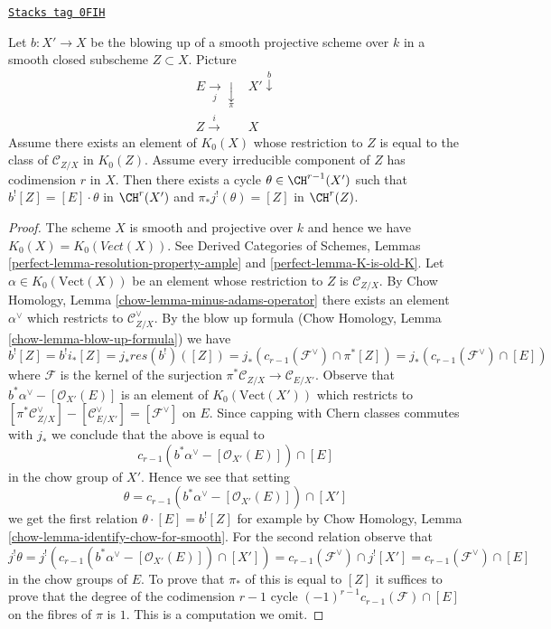 \begin{lemma}
\label{weil-lemma-divide-pullback-good-blowing-up}
\href{https://stacks.math.columbia.edu/tag/0FIH}{\texttt{Stacks tag 0FIH}}

Let $b : X' \to X$ be the blowing up of a smooth projective
scheme over $k$ in a smooth closed subscheme $Z \subset X$.
Picture
$$
\begin{array}{cc}E \underset{j}{\longrightarrow}\underset{\pi}{\downarrow} & X' \overset{b}{\downarrow} \\ Z \overset{i}{\longrightarrow} & X\end{array}
$$
Assume there exists an element of $K_0(X)$ whose restriction to
$Z$ is equal to the class of $\mathcal{C}_{Z/X}$ in $K_0(Z)$.
Assume every irreducible component of $Z$ has codimension $r$ in $X$.
Then there exists a cycle $\theta \in \CH^{r - 1}(X')$
such that $b^![Z] = [E] \cdot \theta$ in $\CH^r(X')$ and
$\pi_*j^!(\theta) = [Z]$ in $\CH^r(Z)$.
\end{lemma}

\begin{proof}
The scheme $X$ is smooth and projective over $k$ and hence we have
$K_0(X) = K_0(\textit{Vect}(X))$. See
Derived Categories of Schemes, Lemmas
\ref{perfect-lemma-resolution-property-ample} and
\ref{perfect-lemma-K-is-old-K}.
Let $\alpha \in K_0(\text{Vect}(X))$ be an element
whose restriction to $Z$ is $\mathcal{C}_{Z/X}$.
By Chow Homology, Lemma \ref{chow-lemma-minus-adams-operator}
there exists an element $\alpha^\vee$ which restricts to
$\mathcal{C}_{Z/X}^\vee$. By the blow up formula
(Chow Homology, Lemma \ref{chow-lemma-blow-up-formula})
we have
$$
b^![Z] = b^!i_*[Z] = j_* res(b^!)([Z]) =
j_*(c_{r - 1}(\mathcal{F}^\vee) \cap \pi^*[Z]) =
j_*(c_{r - 1}(\mathcal{F}^\vee) \cap [E])
$$
where $\mathcal{F}$ is the kernel of the surjection
$\pi^*\mathcal{C}_{Z/X} \to \mathcal{C}_{E/X'}$.
Observe that $b^*\alpha^\vee - [\mathcal{O}_{X'}(E)]$
is an element of $K_0(\text{Vect}(X'))$ which
restricts to $[\pi^*\mathcal{C}_{Z/X}^\vee] - [\mathcal{C}_{E/X'}^\vee] =
[\mathcal{F}^\vee]$ on $E$. Since capping with Chern classes
commutes with $j_*$ we conclude that the above is equal to
$$
c_{r - 1}(b^*\alpha^\vee - [\mathcal{O}_{X'}(E)]) \cap [E]
$$
in the chow group of $X'$. Hence we see that setting
$$
\theta = c_{r - 1}(b^*\alpha^\vee - [\mathcal{O}_{X'}(E)]) \cap [X']
$$
we get the first relation $\theta \cdot [E] = b^![Z]$
for example by Chow Homology, Lemma \ref{chow-lemma-identify-chow-for-smooth}.
For the second relation observe that
$$
j^!\theta = j^!(c_{r - 1}(b^*\alpha^\vee - [\mathcal{O}_{X'}(E)]) \cap [X'])
= c_{r - 1}(\mathcal{F}^\vee) \cap j^![X'] =
c_{r - 1}(\mathcal{F}^\vee) \cap [E]
$$
in the chow groups of $E$. To prove that $\pi_*$ of this is equal to $[Z]$ it
suffices to prove that the degree of the codimension $r - 1$ cycle
$(-1)^{r - 1}c_{r - 1}(\mathcal{F}) \cap [E]$ on the fibres of $\pi$ is $1$.
This is a computation we omit.
\end{proof}


